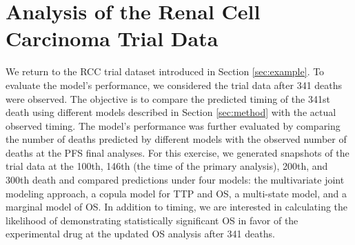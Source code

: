 \documentclass[aoas]{imsart}
\theoremstyle{plain}
\theoremstyle{remark}
\begin{document}
\section{Analysis of the Renal Cell Carcinoma Trial Data}
\label{sec:caseanalysis}
We return to the RCC trial dataset introduced in Section \ref{sec:example}. To evaluate the model's performance, we considered the trial data after 341 deaths were observed. The objective is to compare the predicted timing of the 341st death using different models described in Section \ref{sec:method} with the actual observed timing. The model's performance was further evaluated by comparing the number of deaths predicted by different models with the observed number of deaths at the PFS final analyses. For this exercise, we generated snapshots of the trial data at the 100th, 146th (the time of the primary analysis), 200th, and 300th death and compared predictions under four models: the multivariate joint modeling approach, a copula model for TTP and OS, a multi-state model, and a marginal model of OS. In addition to timing, we are interested in calculating the likelihood of demonstrating statistically significant OS in favor of the experimental drug at the updated OS analysis after 341 deaths.
\end{document}
